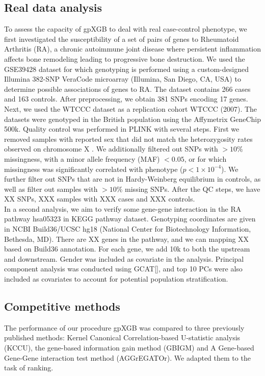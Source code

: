 \documentclass[11pt]{article}
\theoremstyle{plain}
\theoremstyle{definition}
\theoremstyle{remark}
\begin{document}
\subsection{Real data analysis}
To assess the capacity of gpXGB to deal with real case-control phenotype, we first investigated the susceptibility of a set of pairs of genes to Rheumatoid Arthritis (RA), a chronic autoimmune joint disease where persistent inflammation affects bone remodeling leading to progressive bone destruction. We used the GSE39428 dataset for which genotyping is performed using a custom-designed Illumina 382-SNP VeraCode microarray (Illumina, San Diego, CA, USA) to determine possible associations of genes to RA. The dataset contains 266 cases and 163 controls. After preprocessing, we obtain 381 SNPs encoding 17 genes. Next, we used the WTCCC dataset as a replication cohort WTCCC (2007). The datasets were genotyped in the British population using the Affymetrix GeneChip 500k. Quality control was performed in PLINK with several steps. First we removed samples with reported sex that did not 
match the heterozygosity rates observed on chromosome X \cite{12}. We additionally filtered out SNPs with $>10\%$ missingness,  with a minor allele frequency (MAF) $<0.05$, or for which missingness was significantly correlated with 
phenotype ($p<1\times 10^{-4}$). We further filter out SNPs that are not in Hardy-Weinberg equilibrium in controls, as well as filter out samples with $>10\%$ missing SNPs. After the QC steps, we have XX SNPs, XXX samples with XXX cases and XXX controls.\\

In a second analysis, we aim to verify some gene-gene interaction in the RA pathway hsa05323 in KEGG pathway dataset. Genotyping coordinates are given in NCBI Build36/UCSC hg18 (National Center for Biotechnology Information, Bethesda, MD). There are XX genes in the pathway, and we can mapping XX based on Build36 annotation. For each gene, we add 10k to both the upstream and downstream. Gender was included as covariate in the analysis. Principal component analysis was conducted using GCAT[], and top 10 PCs were also included as covariates to account for potential population stratification.\\

\subsection{Competitive methods}
The performance of our procedure gpXGB was compared to three previously published methods: Kernel Canonical Correlation-based U-statistic analysis (KCCU)\cite{4, 5}, the gene-based information gain method (GBIGM)\cite{6} and A Gene-based Gene-Gene interaction test method (AGGrEGATOr)\cite{7}. We adapted them to the task of ranking.
\end{document}
